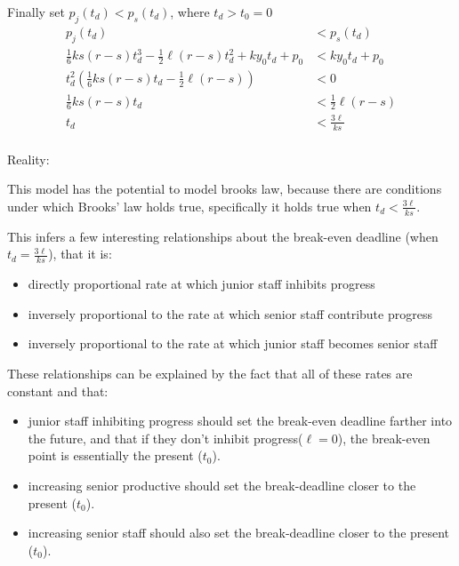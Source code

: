 \documentclass{article}
\newenvironment{atomize}
    {\begin{list} {} {
            \setlength\itemindent{0pt}
            \setlength\leftmargin{10pt}
            \setlength\labelwidth{0pt}
    }}
    {\end{list}}
\begin{document}
\begin{atomize}
\begin{atomize}
        \item Finally set $p_{j}(t_{d}) < p_{s}(t_{d})$, where 
        $t_{d} > t_{0} = 0$
          \begin{align*}
            p_{j}(t_{d}) &< p_{s}(t_{d}) \\[6pt]
            \frac{1}{6}ks(r - s)t_{d}^{3} - \frac{1}{2}\ell(r - s)t_{d}^{2}
            + ky_{0}t_{d}  + p_{0} &< ky_{0}t_{d} + p_{0} \\[6pt]
            t_{d}^{2}\left(\frac{1}{6}ks(r - s)t_{d}
            - \frac{1}{2}\ell(r - s)\right) &< 0 \\[6pt]
            \frac{1}{6}ks(r - s)t_{d}
            &< \frac{1}{2}\ell(r - s) \\[6pt]
            t_{d} &< \frac{3\ell}{ks} \\[6pt]
          \end{align*}

      \end{atomize}

    \item Reality:
      \begin{atomize}
        \item This model has the potential to model brooks law, because there
          are conditions under which Brooks' law holds true, specifically it
          holds true when $t_{d} < \frac{3\ell}{ks}$.

          \item This infers a few interesting relationships about the 
          break-even deadline (when $t_{d} = \frac{3\ell}{ks}$), that it is:
            \begin{itemize}
              \item directly proportional rate at which junior staff inhibits
              progress
              \item inversely proportional to the rate at which senior
              staff contribute progress
              \item inversely proportional to the rate at which junior
              staff becomes senior staff
            \end{itemize}
          These relationships can be explained by the fact that all of these 
          rates are constant and that:
            \begin{itemize}
              \item junior staff inhibiting progress should set the break-even
              deadline farther into the future, and that if they don't inhibit
              progress($\ell = 0$), the break-even point is essentially the
              present ($t_{0}$).
              \item increasing senior productive should set the break-deadline
              closer to the present ($t_{0}$).
              \item increasing senior staff should also set the break-deadline
              closer to the present ($t_{0}$).
            \end{itemize}


\end{atomize}
\end{atomize}
\end{document}
